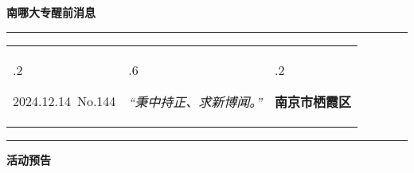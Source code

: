 \documentclass[letterpaper, 12pt]{article}
\begin{document}
\begin{center}
    \Huge\textbf{南哪大专醒前消息}
\end{center}
\vspace{4mm}
\hrule
\renewcommand\tabularxcolumn[1]{m{#1}}
\begin{tabularx}{\textwidth}{>{\hsize.2\hsize}X>{\hsize.6\hsize}X>{\hsize.2\hsize}X}
    \begin{flushleft}
        2024.12.14\, No.144
    \end{flushleft}
    &
    \begin{center}
        \textit{“秉中持正、求新博闻。”}
    \end{center}
    &
    \begin{flushright}
        \textbf{南京市栖霞区}
    \end{flushright}
\end{tabularx}
\vspace{-3.5mm}
\hrule
\vspace{4mm}
\centerline{\huge\textbf{活动预告}}
\end{document}
